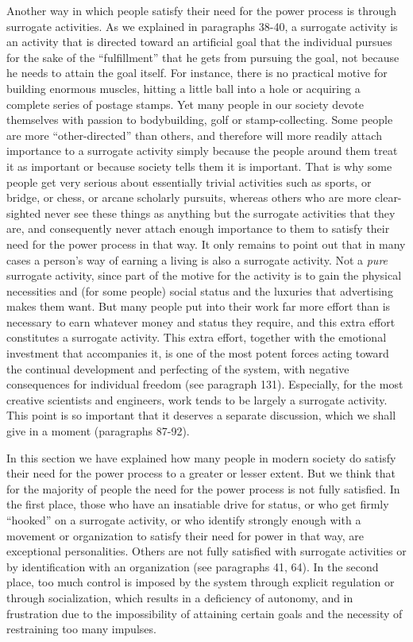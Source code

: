  Another way in which people satisfy their need for the power process is through surrogate activities. As we explained in paragraphs 38-40, a surrogate activity is an activity that is directed toward an artificial goal that the individual pursues for the sake of the “fulfillment” that he gets from pursuing the goal, not because he needs to attain the goal itself. For instance, there is no practical motive for building enormous muscles, hitting a little ball into a hole or acquiring a complete series of postage stamps. Yet many people in our society devote themselves with passion to bodybuilding, golf or stamp-collecting. Some people are more “other-directed” than others, and therefore will more readily attach importance to a surrogate activity simply because the people around them treat it as important or because society tells them it is important. That is why some people get very serious about essentially trivial activities such as sports, or bridge, or chess, or arcane scholarly pursuits, whereas others who are more clear-sighted never see these things as anything but the surrogate activities that they are, and consequently never attach enough importance to them to satisfy their need for the power process in that way. It only remains to point out that in many cases a person’s way of earning a living is also a surrogate activity. Not a {\em pure} surrogate activity, since part of the motive for the activity is to gain the physical necessities and (for some people) social status and the luxuries that advertising makes them want. But many people put into their work far more effort than is necessary to earn whatever money and status they require, and this extra effort constitutes a surrogate activity. This extra effort, together with the emotional investment that accompanies it, is one of the most potent forces acting toward the continual development and perfecting of the system, with negative consequences for individual freedom (see paragraph 131). Especially, for the most creative scientists and engineers, work tends to be largely a surrogate activity. This point is so important that it deserves a separate discussion, which we shall give in a moment (paragraphs 87-92).

 In this section we have explained how many people in modern society do satisfy their need for the power process to a greater or lesser extent. But we think that for the majority of people the need for the power process is not fully satisfied. In the first place, those who have an insatiable drive for status, or who get firmly “hooked” on a surrogate activity, or who identify strongly enough with a movement or organization to satisfy their need for power in that way, are exceptional personalities. Others are not fully satisfied with surrogate activities or by identification with an organization (see paragraphs 41, 64). In the second place, too much control is imposed by the system through explicit regulation or through socialization, which results in a deficiency of autonomy, and in frustration due to the impossibility of attaining certain goals and the necessity of restraining too many impulses.

